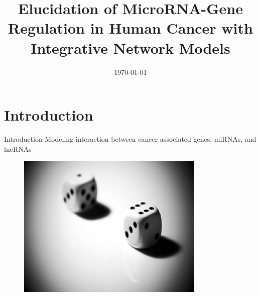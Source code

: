 \documentclass{beamer}
\title[Cancer Network]{Elucidation of MicroRNA-Gene Regulation in Human Cancer with Integrative Network Models}
\author[Dogan]
{%
	\texorpdfstring{
		\begin{columns}
			\column{.85\linewidth}
			\centering
			Haluk Dogan, Zeynep Hakguder, Stephen Scott, and Juan Cui$^{*}$
		\end{columns}
	}
	{Dogan}
}
\institute[UNL] %
{
  Systems Biology and Biomedical Informatics Laboratory\\
  \url{https://sbbi.unl.edu/}\\\vspace{1cm}
  Department of Computer Science and Engineering\\
  University of Nebraska-Lincoln
}
\date[\today] %
{\today}
\begin{document}
\begin{frame}
  \titlepage{}
\end{frame}

\section{Introduction}
\begin{frame}{Introduction}
  Modeling interaction between cancer associated genes, miRNAs, and lncRNAs
  \begin{figure}[ht]
    \centering
    \includegraphics[width=0.8\textwidth, height=0.5\textheight]{figures/prob.jpeg}
    \caption*{\label{fig:prob} }
  \end{figure}
\end{frame}
\end{document}
